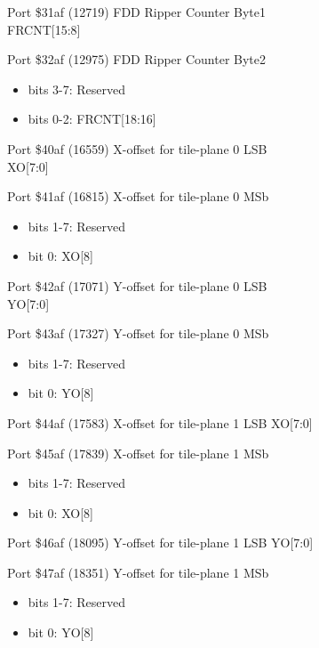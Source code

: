 Port \$31af (12719) FDD Ripper Counter Byte1\\
FRCNT[15:8]

Port \$32af (12975) FDD Ripper Counter Byte2
\begin{itemize}
\item[] bits 3-7: Reserved
\item[] bits 0-2: FRCNT[18:16]
\end{itemize}

Port \$40af (16559) X-offset for tile-plane 0 LSB\\
XO[7:0]

Port \$41af (16815) X-offset for tile-plane 0 MSb
\begin{itemize}
\item[] bits 1-7: Reserved
\item[] bit 0: XO[8]
\end{itemize}

Port \$42af (17071) Y-offset for tile-plane 0 LSB\\
YO[7:0]

Port \$43af (17327) Y-offset for tile-plane 0 MSb
\begin{itemize}
\item[] bits 1-7: Reserved
\item[] bit 0: YO[8]
\end{itemize}

Port \$44af (17583) X-offset for tile-plane 1 LSB
XO[7:0]

Port \$45af (17839) X-offset for tile-plane 1 MSb
\begin{itemize}
\item[] bits 1-7: Reserved
\item[] bit 0: XO[8]
\end{itemize}

Port \$46af (18095) Y-offset for tile-plane 1 LSB
YO[7:0]

Port \$47af (18351) Y-offset for tile-plane 1 MSb
\begin{itemize}
\item[] bits 1-7: Reserved
\item[] bit 0: YO[8]
\end{itemize}
